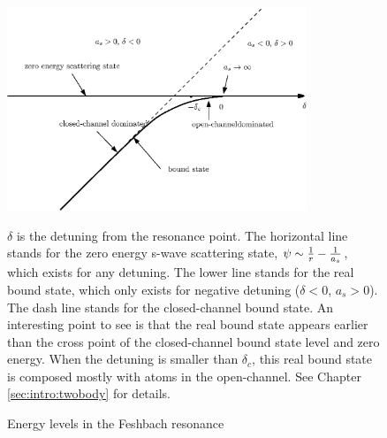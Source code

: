 \begin{figure}[htbp]
\begin{center}
\includegraphics[width=0.8\textwidth]{levels}
\caption{Energy levels in the Feshbach resonance\label{fig:intro:levels}} 
\parbox{0.7\textwidth}{\small $\delta$ is the detuning from the resonance point.  The horizontal line stands for the zero energy s-wave scattering state, $\psi\sim\frac{1}{r}-\frac{1}{a_s}$, which exists for any detuning.  The lower line stands for the real bound state, which only exists for negative detuning ($\delta<0$, $a_s>0$). The dash line stands for the closed-channel bound state.  An interesting point to see is that the real bound state appears earlier than the cross point of the closed-channel bound state level and zero energy. When the detuning is smaller than $\delta_c$, this real bound state is composed mostly with atoms in the open-channel. See Chapter \ref{sec:intro:twobody} for details.   }

\end{center}
\end{figure}

